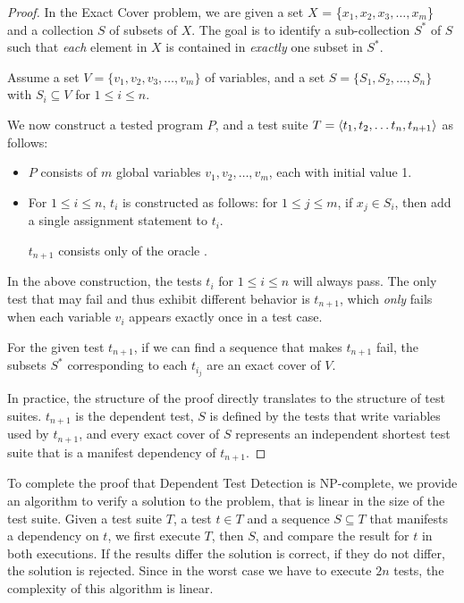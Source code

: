 \begin{proof}
In the Exact Cover problem,
we are given a set $X$ = \{$x_1, x_2, x_3, \dots, x_m$\} and a collection $S$ of subsets of $X$.
The goal is to identify a sub-collection $S^*$ of $S$ such that \textit{each}
element in $X$ is contained in \textit{exactly} one subset in $S^*$.  

Assume a set $V = \{v_1, v_2, v_3, \dots, v_m\}$ of variables,
and a set $S = \{S_1, S_2, \dots, S_n\}$ with $S_i \subseteq V$ for $ 1\leq i
\leq n$. 

We now construct a tested program $P$, and a test suite
$T =  \langle t_1, t_2, \dots t_n , t_{n+1} \rangle $ as follows:

\begin{itemize}

\item $P$ consists of $m$ global variables 
$v_1, v_2,\dots, v_m$, each with initial value 1.

\item 
For $1 \le i \le n$, $t_i$ is constructed as follows:
for $1 \le j \le m$, if $x_j \in S_i$, then add a
single assignment statement  to $t_i$.

$t_{n+1}$ consists only of the oracle
.

\end{itemize}

In the above construction, the tests $t_i$ for $1 \le i \le n$ 
will always pass. The only
test that may fail and thus exhibit different behavior is $t_{n+1}$, which 
\emph{only} fails when each variable $v_i$ appears exactly
once in a test case.

For the given test $t_{n+1}$, if we can
find a sequence 
that makes $t_{n+1}$ fail, the subsets $S^*$ corresponding
to each $t_{i_j}$ are an exact cover of $V$.

In practice, the structure of the proof directly translates to the
structure of test suites. $t_{n+1}$ is the dependent test, $S$ is
defined by the tests that write variables used by $t_{n+1}$, and every
exact cover of $S$ represents an independent shortest test suite that
is a manifest dependency of $t_{n+1}$.
\end{proof}

To complete the proof that Dependent Test Detection is NP-complete, we
provide an algorithm to verify a solution to the problem, that is
linear in the size of the test suite.
Given a test suite $T$, a test $t \in T$ and a sequence
$S \subseteq T$ that manifests a dependency on $t$, we first execute $T$, then $S$, and
compare the result for $t$ in both executions. 
If the results differ the solution is correct, if they do not differ,
the solution is rejected.
Since in the worst case we have to execute $2n$ tests, the complexity
of this algorithm is linear. 



